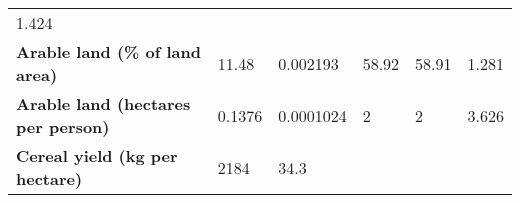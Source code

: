 \documentclass[
]{article}
\begin{document}
\begin{longtable}[]{@{}llllll@{}}
\begin{minipage}[t]{0.13\columnwidth}
1.424\strut
\end{minipage}\tabularnewline
\begin{minipage}[t]{0.20\columnwidth}\raggedright
\textbf{Arable land (\% of land area)}\strut
\end{minipage} & \begin{minipage}[t]{0.12\columnwidth}\raggedright
11.48\strut
\end{minipage} & \begin{minipage}[t]{0.14\columnwidth}\raggedright
0.002193\strut
\end{minipage} & \begin{minipage}[t]{0.13\columnwidth}\raggedright
58.92\strut
\end{minipage} & \begin{minipage}[t]{0.13\columnwidth}\raggedright
58.91\strut
\end{minipage} & \begin{minipage}[t]{0.13\columnwidth}\raggedright
1.281\strut
\end{minipage}\tabularnewline
\begin{minipage}[t]{0.20\columnwidth}\raggedright
\textbf{Arable land (hectares per person)}\strut
\end{minipage} & \begin{minipage}[t]{0.12\columnwidth}\raggedright
0.1376\strut
\end{minipage} & \begin{minipage}[t]{0.14\columnwidth}\raggedright
0.0001024\strut
\end{minipage} & \begin{minipage}[t]{0.13\columnwidth}\raggedright
2\strut
\end{minipage} & \begin{minipage}[t]{0.13\columnwidth}\raggedright
2\strut
\end{minipage} & \begin{minipage}[t]{0.13\columnwidth}\raggedright
3.626\strut
\end{minipage}\tabularnewline
\begin{minipage}[t]{0.20\columnwidth}\raggedright
\textbf{Cereal yield (kg per hectare)}\strut
\end{minipage} & \begin{minipage}[t]{0.12\columnwidth}\raggedright
2184\strut
\end{minipage} & \begin{minipage}[t]{0.14\columnwidth}\raggedright
34.3\strut
\end{minipage} & \begin{minipage}[t]{0.13\columnwidth}\raggedright

\end{minipage}
\end{longtable}
\end{document}
